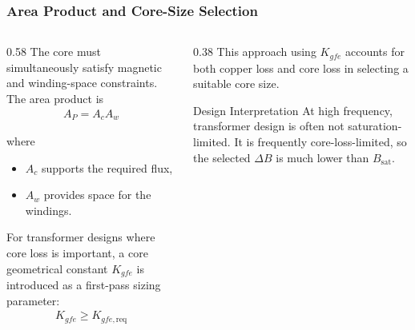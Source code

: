 \begin{frame}
    \frametitle{Area Product and Core-Size Selection}

    \begin{columns}
        \begin{column}{0.58\textwidth}
            The core must simultaneously satisfy magnetic and winding-space constraints. The area product is
            \begin{align}
                A_P = A_c A_w
            \end{align}

            where
            \begin{itemize}
                \item $A_c$ supports the required flux,
                \item $A_w$ provides space for the windings.
            \end{itemize}
            For transformer designs where core loss is important, a core geometrical constant $K_{gfe}$ is introduced as a first-pass sizing parameter:
            \begin{align}
                K_{gfe} \geq K_{gfe,\mathrm{req}}
            \end{align}
        \end{column}

        \begin{column}{0.38\textwidth}
            This approach using $K_{gfe}$ accounts for both copper loss and core loss in selecting a suitable core size.
            \begin{block}{Design Interpretation}
                \small
                At high frequency, transformer design is often not saturation-limited. It is frequently core-loss-limited, so the selected $\Delta B$ is much lower than $B_{\mathrm{sat}}$.
            \end{block}
        \end{column}
    \end{columns}
\end{frame}


